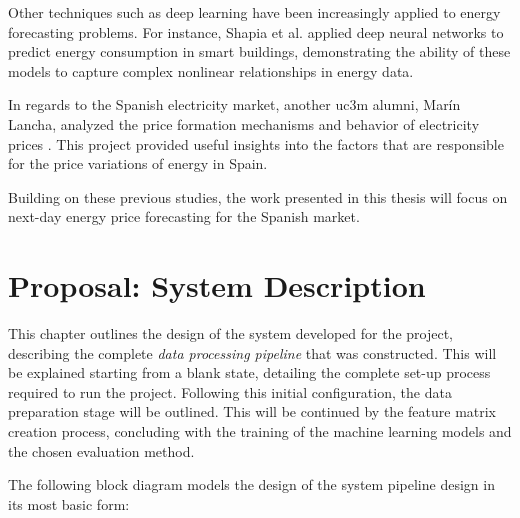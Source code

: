 \documentclass[12pt]{report} %
\begin{document}
Other techniques such as deep learning have been increasingly applied to energy forecasting problems. For instance, Shapia et al. \cite{malasyia-neural-nets} applied deep neural networks to predict energy consumption in smart buildings, demonstrating the ability of these models to capture complex nonlinear relationships in energy data.

In regards to the Spanish electricity market, another uc3m alumni, Marín Lancha, analyzed the price formation mechanisms and behavior of electricity prices \cite{electricity-price-uc3m-tfg}. This project provided useful insights into the factors that are responsible for the price variations of energy in Spain.

Building on these previous studies, the work presented in this thesis will focus on next-day energy price forecasting for the Spanish market.





\chapter{Proposal: System Description}
\label{chap:03}
This chapter outlines the design of the system developed for the project, describing the complete \textit{data processing pipeline} that was constructed. This will be explained starting from a blank state, detailing the complete set-up process required to run the project. Following this initial configuration, the data preparation stage will be outlined. This will be continued by the feature matrix creation process, concluding with the training of the machine learning models and the chosen evaluation method.

The following block diagram models the design of the system pipeline design in its most basic form:


\end{document}
